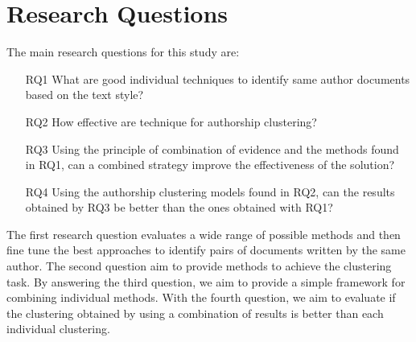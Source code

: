 \section{Research Questions}

The main research questions for this study are:

\begin{enumerate}
  \item[RQ1]
  What are good individual techniques to identify same author documents based on the text style?
  \item[RQ2]
  How effective are technique for authorship clustering?
  \item[RQ3]
  Using the principle of combination of evidence and the methods found in RQ1, can a combined strategy improve the effectiveness of the solution?
  \item[RQ4]
  Using the authorship clustering models found in RQ2, can the results obtained by RQ3 be better than the ones obtained with RQ1?
\end{enumerate}

The first research question evaluates a wide range of possible methods and then fine tune the best approaches to identify pairs of documents written by the same author.
The second question aim to provide methods to achieve the clustering task.
By answering the third question, we aim to provide a simple framework for combining individual methods.
With the fourth question, we aim to evaluate if the clustering obtained by using a combination of results is better than each individual clustering.
